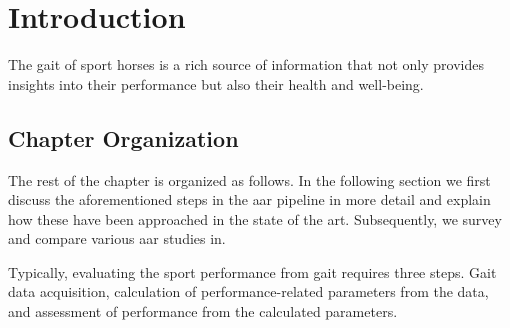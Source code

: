 \section{Introduction}


The gait of sport horses is a rich source of information that not only provides insights into their performance but also their health and well-being.

\subsection{Chapter Organization}

The rest of the chapter is organized as follows.
In the following section we first discuss the aforementioned steps in the \gls{aar} pipeline in more detail and explain how these have been approached in the state of the art.
Subsequently, we survey and compare various \gls{aar} studies in. 

Typically, evaluating the sport performance from gait requires three steps. Gait data acquisition, calculation of performance-related parameters from the data, and assessment of performance from the calculated parameters.